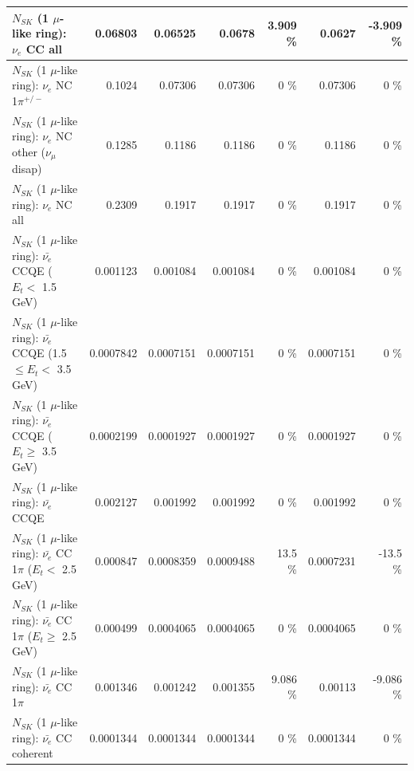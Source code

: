 \begin{table}
\begin{tabular}{| l | r | r | r  r | r  r |}
                                  $N_{SK}$ (1 $\mu$-like ring): $\nu_{e}$ CC all &         0.06803 &         0.06525 &          0.0678 &    3.909 \%  &          0.0627 &   -3.909 \%  \\ 
\hline
                           $N_{SK}$ (1 $\mu$-like ring): $\nu_e$ NC 1$\pi^{+/-}$ &          0.1024 &         0.07306 &         0.07306 &        0 \%  &         0.07306 &        0 \%  \\ 
                $N_{SK}$ (1 $\mu$-like ring): $\nu_e$ NC other ($\nu_\mu$ disap) &          0.1285 &          0.1186 &          0.1186 &        0 \%  &          0.1186 &        0 \%  \\ 
                                  $N_{SK}$ (1 $\mu$-like ring): $\nu_{e}$ NC all &          0.2309 &          0.1917 &          0.1917 &        0 \%  &          0.1917 &        0 \%  \\ 
\hline
\hline
\hline
            $N_{SK}$ (1 $\mu$-like ring): $\bar{\nu_e}$ CCQE ($E_{t} <$ 1.5 GeV) &        0.001123 &        0.001084 &        0.001084 &        0 \%  &        0.001084 &        0 \%  \\ 
   $N_{SK}$ (1 $\mu$-like ring): $\bar{\nu_e}$ CCQE (1.5 $\leq E_{t} <$ 3.5 GeV) &       0.0007842 &       0.0007151 &       0.0007151 &        0 \%  &       0.0007151 &        0 \%  \\ 
         $N_{SK}$ (1 $\mu$-like ring): $\bar{\nu_e}$ CCQE ($E_{t} \geq$ 3.5 GeV) &       0.0002199 &       0.0001927 &       0.0001927 &        0 \%  &       0.0001927 &        0 \%  \\ 
\hline
                                $N_{SK}$ (1 $\mu$-like ring): $\bar{\nu_e}$ CCQE &        0.002127 &        0.001992 &        0.001992 &        0 \%  &        0.001992 &        0 \%  \\ 
\hline
       $N_{SK}$ (1 $\mu$-like ring): $\bar{\nu_e}$ CC 1$\pi$ ($E_{t} <$ 2.5 GeV) &        0.000847 &       0.0008359 &       0.0009488 &     13.5 \%  &       0.0007231 &    -13.5 \%  \\ 
    $N_{SK}$ (1 $\mu$-like ring): $\bar{\nu_e}$ CC 1$\pi$ ($E_{t} \geq$ 2.5 GeV) &        0.000499 &       0.0004065 &       0.0004065 &        0 \%  &       0.0004065 &        0 \%  \\ 
\hline
                           $N_{SK}$ (1 $\mu$-like ring): $\bar{\nu_e}$ CC 1$\pi$ &        0.001346 &        0.001242 &        0.001355 &    9.086 \%  &         0.00113 &   -9.086 \%  \\ 
                         $N_{SK}$ (1 $\mu$-like ring): $\bar{\nu_e}$ CC coherent &       0.0001344 &       0.0001344 &       0.0001344 &        0 \%  &       0.0001344 &        0 \%  \\ 

\end{tabular}
\end{table}
